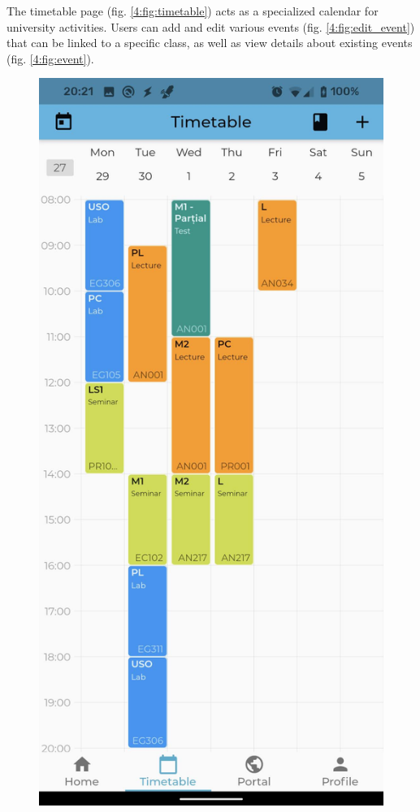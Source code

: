 \clearpage

The timetable page (fig. \ref{4:fig:timetable}) acts as a specialized calendar for university activities. Users can add and edit various events (fig. \ref{4:fig:edit_event}) that can be linked to a specific class, as well as view details about existing events (fig. \ref{4:fig:event}).

\begin{figure}[!ht]
    \centering
    \begin{minipage}[b]{0.26\textwidth}
        \captionsetup{justification=centering}
        \includegraphics[width=\textwidth]{figures/app/flutter/timetable.jpg}

\end{minipage}
\end{figure}
